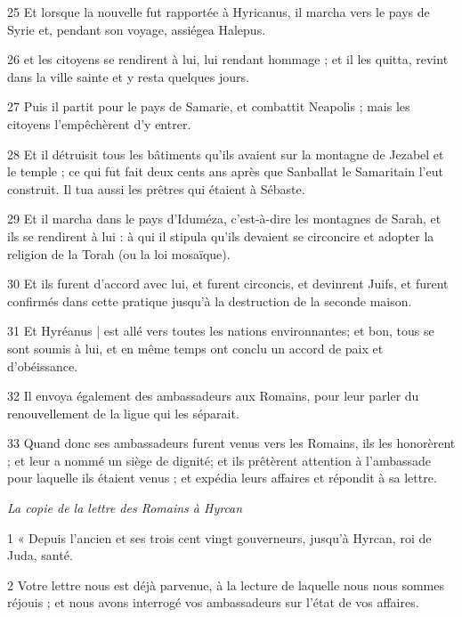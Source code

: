 \par 25 Et lorsque la nouvelle fut rapportée à Hyricanus, il marcha vers le pays de Syrie et, pendant son voyage, assiégea Halepus.

\par 26 et les citoyens se rendirent à lui, lui rendant hommage ; et il les quitta, revint dans la ville sainte et y resta quelques jours.

\par 27 Puis il partit pour le pays de Samarie, et combattit Neapolis ; mais les citoyens l'empêchèrent d'y entrer.

\par 28 Et il détruisit tous les bâtiments qu'ils avaient sur la montagne de Jezabel et le temple ; ce qui fut fait deux cents ans après que Sanballat le Samaritain l'eut construit. Il tua aussi les prêtres qui étaient à Sébaste.

\par 29 Et il marcha dans le pays d'Iduméza, c'est-à-dire les montagnes de Sarah, et ils se rendirent à lui : à qui il stipula qu'ils devaient se circoncire et adopter la religion de la Torah (ou la loi mosaïque).

\par 30 Et ils furent d'accord avec lui, et furent circoncis, et devinrent Juifs, et furent confirmés dans cette pratique jusqu'à la destruction de la seconde maison.

\par 31 Et Hyréanus | est allé vers toutes les nations environnantes; et bon, tous se sont soumis à lui, et en même temps ont conclu un accord de paix et d'obéissance.

\par 32 Il envoya également des ambassadeurs aux Romains, pour leur parler du renouvellement de la ligue qui les séparait.

\par 33 Quand donc ses ambassadeurs furent venus vers les Romains, ils les honorèrent ; et leur a nommé un siège de dignité; et ils prêtèrent attention à l'ambassade pour laquelle ils étaient venus ; et expédia leurs affaires et répondit à sa lettre.


\textit{La copie de la lettre des Romains à Hyrcan}

\par 1 « Depuis l'ancien et ses trois cent vingt gouverneurs, jusqu'à Hyrcan, roi de Juda, santé.

\par 2 Votre lettre nous est déjà parvenue, à la lecture de laquelle nous nous sommes réjouis ; et nous avons interrogé vos ambassadeurs sur l'état de vos affaires.

